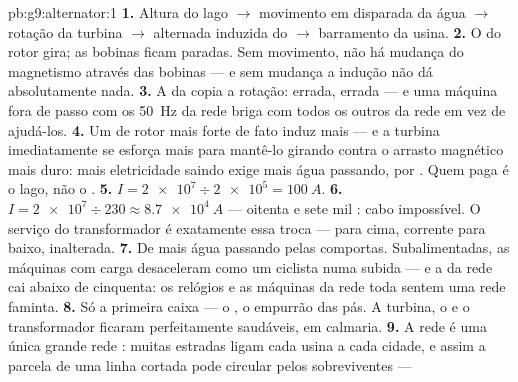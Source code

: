 \begin{solution}{pb:g9:alternator:1}
\textbf{1.} Altura do lago $\to$ movimento em disparada da água $\to$
rotação da turbina $\to$  alternada induzida do 
$\to$ barramento da usina.
\textbf{2.} O  do rotor gira; as bobinas ficam paradas. Sem
movimento, não há mudança do magnetismo através das bobinas --- e sem
mudança a indução não dá absolutamente nada.
\textbf{3.} A  da  copia a rotação: 
errada,  errada --- e uma máquina fora de passo com os
\qty{50}{Hz} da rede briga com todos os outros  da rede
em vez de ajudá-los.
\textbf{4.} Um  de rotor mais forte de fato induz mais --- e a
turbina imediatamente se esforça mais para mantê-lo girando contra o
arrasto magnético mais duro: mais eletricidade saindo exige mais água
passando,  por . Quem paga é o lago, não o .
\textbf{5.} $I = \num{2e7} \div \num{2e5} = \qty{100}{A}$.
\textbf{6.} $I = \num{2e7} \div 230 \approx \qty{8.7e4}{A}$ ---
oitenta e sete mil : cabo impossível. O serviço do
transformador é exatamente essa troca ---  para cima, corrente
para baixo,  inalterada.
\textbf{7.} De mais água passando pelas comportas. Subalimentadas, as
máquinas com carga desaceleram como um ciclista numa subida --- e a
 da rede cai abaixo de cinquenta: os relógios e as máquinas
da rede toda sentem uma rede faminta.
\textbf{8.} Só a primeira caixa --- o , o empurrão das pás. A
turbina, o  e o transformador ficaram perfeitamente
saudáveis, em calmaria.
\textbf{9.} A rede é uma única grande rede : muitas
estradas ligam cada usina a cada cidade, e assim a parcela de uma
linha cortada pode circular pelos  sobreviventes ---

\end{solution}

